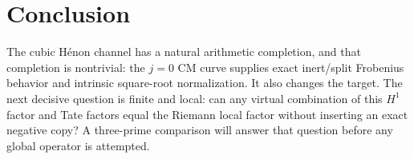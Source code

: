 \documentclass[11pt]{article}
\theoremstyle{remark}\newtheorem{remark}[theorem]{Remark}
\begin{document}
\section{Conclusion}
The cubic H\'enon channel has a natural arithmetic completion, and that
completion is nontrivial: the \(j=0\) CM curve supplies exact inert/split
Frobenius behavior and intrinsic square-root normalization.  It also changes
the target.  The next decisive question is finite and local: can any virtual
combination of this \(H^1\) factor and Tate factors equal the Riemann local
factor without inserting an exact negative copy?  A three-prime comparison
will answer that question before any global operator is attempted.


\end{document}
